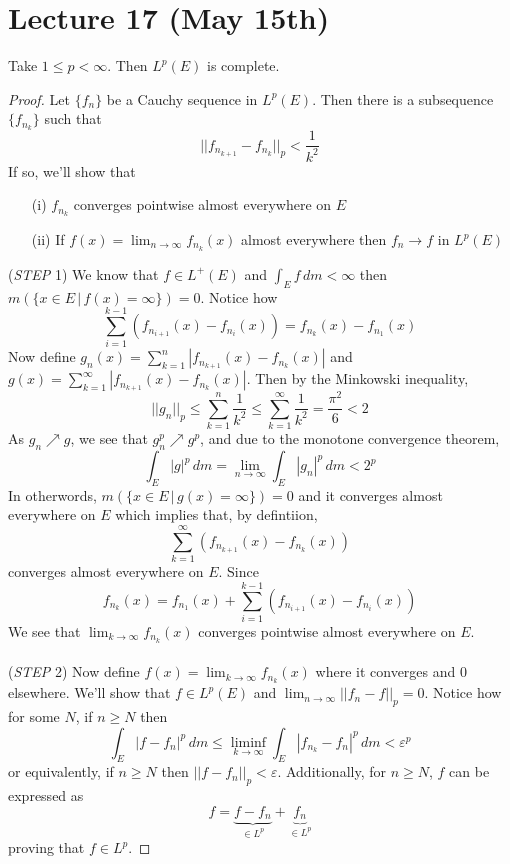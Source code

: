 \section{Lecture 17 (May 15th)}
\begin{thm}
Take $1\leq p<\infty $. Then $L^{p}(E)$ is complete.
\end{thm}
\vspace{2ex}
\begin{proof}
Let $\{f_{n}\}$ be a Cauchy sequence in $L^{p}(E)$. Then there is a subsequence $\{f_{n_{k}}\}$ such that 
\[||f_{n_{k+1}}-f_{n_{k}}||_{p}<\dfrac{1}{k^2}\]
If so, we'll show that 
\begin{itemize}
\item[(i)] $f_{n_{k}}$ converges pointwise almost everywhere on $E$
\item[(ii)] If $f(x)=\lim _{n\rightarrow \infty }f_{n_{k}}(x)$ almost everywhere then $f_{n}\rightarrow f$ in $L^{p}(E)$
\end{itemize}
\newline
({\it STEP} 1) We know that $f\in L^{+}(E)$ and $\int _{E}f\,dm<\infty $ then $m(\{x\in E \,|\, f(x)=\infty \})=0$. Notice how
\[\sum ^{k-1}_{i=1}(f_{n_{i+1}}(x)-f_{n_{i}}(x))=f_{n_{k}}(x)-f_{n_1}(x)\]
Now define $g_{n}(x)=\sum ^{n}_{k=1}|f_{n_{k+1}}(x)-f_{n_{k}}(x)|$ and $g(x)=\sum _{k=1}^{\infty }|f_{n_{k+1}}(x)-f_{n_{k}}(x)|$. Then by the Minkowski inequality, 
\[||g_{n}||_{p}\leq \sum ^{n }_{k=1}\dfrac{1}{k^2}\leq \sum ^{\infty }_{k=1}\dfrac{1}{k^2}=\dfrac{\pi ^2}{6}<2\]
As $g_{n}\nearrow g$, we see that $g_{n}^{p}\nearrow g^{p}$, and due to the monotone convergence theorem, 
\[\int _{E}|g|^{p}\,d m=\lim _{n\rightarrow \infty }\int _{E}|g_{n}|^{p}\,d m<2^{p}\]
In otherwords, $m(\{x\in E \,|\, g(x)=\infty \})=0$ and it converges almost everywhere on $E$ which implies that, by defintiion, 
\[\sum ^{\infty }_{k=1}(f_{n_{k+1}}(x)-f_{n_{k}}(x))\]
converges almost everywhere on $E$. Since 
\[f_{n_{k}}(x)=f_{n_{1}}(x)+\sum ^{k-1}_{i=1}(f_{n_{i+1}}(x)-f_{n_{i}}(x))\]
We see that $\lim _{k\rightarrow \infty }f_{n_{k}}(x)$ converges pointwise almost everywhere on $E$. 
\\\\
({\it STEP} 2) Now define $f(x)=\lim _{k\rightarrow \infty }f_{n_{k}}(x)$ where it converges and 0 elsewhere. We'll show that $f\in L^{p}(E)$ and $\lim _{n\rightarrow \infty }||f_{n}-f||_{p}=0$. Notice how for some $N$, if $n\geq N$ then 
\[\int _{E}|f-f_{n}|^{p}\,d m\leq \liminf_{k\rightarrow \infty }\int _{E}|f_{n_{k}}-f_{n}|^{p}\,d m<\varepsilon ^{p}\]
or equivalently, if $n\geq N$ then $||f-f_{n}||_{p}<\varepsilon $. Additionally, for $n\geq N$, $f$ can be expressed as  
\[f=\underbrace{f-f_{n}}_{\in L^{p}}+\underbrace{f_{n}}_{\in L^{p}}\]
proving that $f\in L^{p}$. 
\end{proof}
